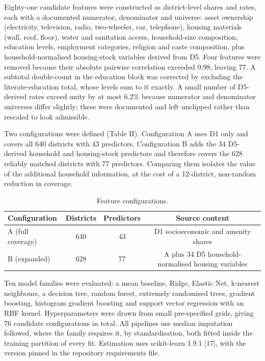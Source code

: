 \documentclass[conference]{IEEEtran}
\begin{document}
Eighty-one candidate features were constructed as district-level shares and rates, each with a documented numerator, denominator and universe: asset ownership (electricity, television, radio, two-wheeler, car, telephone), housing materials (wall, roof, floor), water and sanitation access, household-size composition, education levels, employment categories, religion and caste composition, plus household-normalised housing-stock variables derived from D5. Four features were removed because their absolute pairwise correlation exceeded 0.98, leaving 77. A subtotal double-count in the education block was corrected by excluding the literate-education total, whose levels sum to it exactly. A small number of D5-derived rates exceed unity by at most 6.2\% because numerator and denominator universes differ slightly; these were documented and left unclipped rather than rescaled to look admissible.

Two configurations were defined (Table II). Configuration A uses D1 only and covers all 640 districts with 43 predictors. Configuration B adds the 34 D5-derived household and housing-stock predictors and therefore covers the 628 reliably matched districts with 77 predictors. Comparing them isolates the value of the additional household information, at the cost of a 12-district, non-random reduction in coverage.

\begin{table}[t]
\centering
\caption{Feature configurations.}
\label{tab:1226}
\small
\setlength{\tabcolsep}{4pt}
\begin{tabular}{lccc}
\toprule
\textbf{Configuration} & \textbf{Districts} & \textbf{Predictors} & \textbf{Source content} \\
\midrule
A (full coverage) & 640 & 43 & D1 socioeconomic and amenity shares \\
B (expanded) & 628 & 77 & A plus 34 D5 household-normalised housing variables \\
\bottomrule
\end{tabular}
\end{table}

Ten model families were evaluated: a mean baseline, Ridge, Elastic Net, k-nearest neighbours, a decision tree, random forest, extremely randomised trees, gradient boosting, histogram gradient boosting and support vector regression with an RBF kernel. Hyperparameters were drawn from small pre-specified grids, giving 76 candidate configurations in total. All pipelines use median imputation followed, where the family requires it, by standardisation, both fitted inside the training partition of every fit. Estimation uses scikit-learn 1.9.1 [17], with the version pinned in the repository requirements file.
\end{document}
